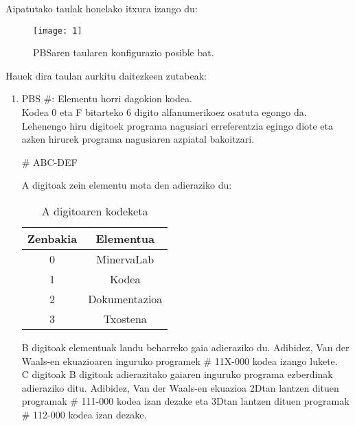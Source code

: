 \documentclass[10pt,a4paper]{article}
\let\nf\normalfont %
\newcommand{\cf}{\normalfont\sffamily}
\begin{document}
\newpage

Aipatutako taulak honelako itxura izango du:

\begin{figure}[h]
\centering
\texttt{[image: 1]}
\caption{PBSaren taularen konfigurazio posible bat.}
\end{figure}

Hauek dira taulan aurkitu daitezkeen zutabeak:

\begin{enumerate}
\item \cf PBS \#: \nf Elementu horri dagokion kodea. 
\\

Kodea 0 eta F bitarteko 6 digito alfanumerikoez osatuta egongo da. Lehenengo hiru digitoek programa nagusiari erreferentzia egingo diote eta azken hirurek programa nagusiaren azpiatal bakoitzari.
\\

\begin{center}
\cf \# ABC-DEF
\end{center}

\cf A \nf digitoak zein elementu mota den adieraziko du:


\begin{table}[h]
\begin{center}
\begin{tabular}{|c|c|}
\hline
\textbf{Zenbakia} & \textbf{Elementua} \\ \hline
0                 & MinervaLab         \\ \hline
1                 & Kodea              \\ \hline
2                 & Dokumentazioa      \\ \hline
3                 & Txostena           \\ \hline
\end{tabular}
\caption{\cf A \nf digitoaren kodeketa}
\end{center}
\end{table}

\cf B \nf digitoak elementuak landu beharreko gaia adieraziko du. Adibidez, Van der Waals-en ekuazioaren inguruko programek \cf \# 11X-000 \nf kodea izango lukete.
\\

\cf C \nf digitoak \cf B \nf digitoak adierazitako gaiaren inguruko programa ezberdinak adieraziko ditu. Adibidez, Van der Waals-en ekuazioa 2Dtan lantzen dituen programak \cf \# 111-000 \nf kodea izan dezake eta 3Dtan lantzen dituen programak \cf \# 112-000 \nf kodea izan dezake.
\\


\end{enumerate}
\end{document}
